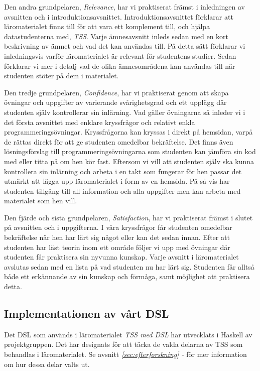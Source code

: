 \documentclass[12pt,a4paper,twoside,openright]{article}
\begin{document}
Den andra grundpelaren, \textit{Relevance}, har vi praktiserat främst
i inledningen av avsnitten och i
introduktionsavsnittet. Introduktionsavsnittet förklarar att
läromaterialet finns till för att vara ett komplement till, och hjälpa
datastudenterna med, \textit{TSS}. Varje ämnesavsnitt inleds sedan med
en kort beskrivning av ämnet och vad det kan användas till. På detta
sätt förklarar vi inledningsvis varför läromaterialet är relevant för
studentens studier. Sedan förklarar vi mer i detalj vad de olika
ämnesområdena kan användas till när studenten stöter på dem i
materialet.

Den tredje grundpelaren, \textit{Confidence}, har vi praktiserat genom
att skapa övningar och uppgifter av varierande svårighetsgrad och ett
upplägg där studenten själv kontrollerar sin inlärning. Vad gäller
övningarna så inleder vi i det första avsnittet med enklare
kryssfrågor och relativt enkla programmeringsövningar. Kryssfrågorna
kan kryssas i direkt på hemsidan, varpå de rättas direkt för att ge
studenten omedelbar bekräftelse. Det finns även lösningsförslag till
programmeringsövningarna som studenten kan jämföra sin kod med eller
titta på om hen kör fast. Eftersom vi vill att studenten själv ska
kunna kontrollera sin inlärning och arbeta i en takt som fungerar för
hen passar det utmärkt att lägga upp läromaterialet i form av en
hemsida. På så vis har studenten tillgång till all information och
alla uppgifter men kan arbeta med materialet som hen vill.

Den fjärde och sista grundpelaren, \textit{Satisfaction}, har vi
praktiserat främst i slutet på avsnitten och i uppgifterna. I våra
kryssfrågor får studenten omedelbar bekräftelse när hen har lärt sig
något eller kan det sedan innan. Efter att studenten har läst teorin
inom ett område följer vi upp med övningar där studenten får
praktisera sin nyvunna kunskap. Varje avsnitt i läromaterialet
avslutas sedan med en lista på vad studenten nu har lärt
sig. Studenten får alltså både ett erkännande av sin kunskap och
förmåga, samt möjlighet att praktisera detta.

\subsection{Implementationen av vårt DSL}
\label{sec:implDSL}
Det DSL som används i läromaterialet \textit{TSS med DSL} har utvecklats i Haskell av
projektgruppen. Det har designats för att täcka de valda delarna av
TSS som behandlas i läromaterialet. Se avsnitt
\textit{\ref{sec:efterforskning} - } för mer
information om hur dessa delar valts ut.
\end{document}
